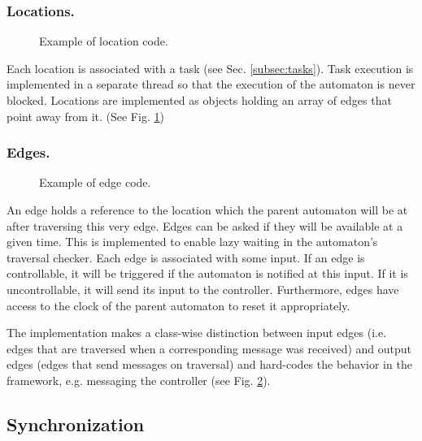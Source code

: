 \subsubsection{Locations.}

\begin{figure}[t]

\caption{Example of location code.}
\label{location-example}
\end{figure}

Each location is associated with a task (see Sec. \ref{subsec:tasks}). Task
execution is implemented in a separate thread so that the execution of the
automaton is never blocked. Locations are implemented as objects holding an
array of edges that point away from it. (See Fig. \ref{location-example})


\subsubsection{Edges.}
\label{subsubsec:edges}

\begin{figure}[t]

\caption{Example of edge code.}
\label{edge-example}
\end{figure}

An edge holds a reference to the location which the parent automaton
will be at after traversing this very edge. Edges can be asked if
they will be available at a given time. This is implemented to enable
lazy waiting in the automaton's traversal checker. Each edge is associated
with some input. If an edge is controllable, it will be triggered
if the automaton is notified at this input. If it is uncontrollable,
it will send its input to the controller. Furthermore, edges have
access to the clock of the parent automaton to reset it appropriately.

The implementation makes a class-wise distinction between input edges
(i.e. edges that are traversed when a corresponding message was received) and
output edges (edges that send messages on traversal) and hard-codes the behavior
in the framework, e.g. messaging the controller (see Fig. \ref{edge-example}).


\subsection{Synchronization}
\label{subsec:synch}

